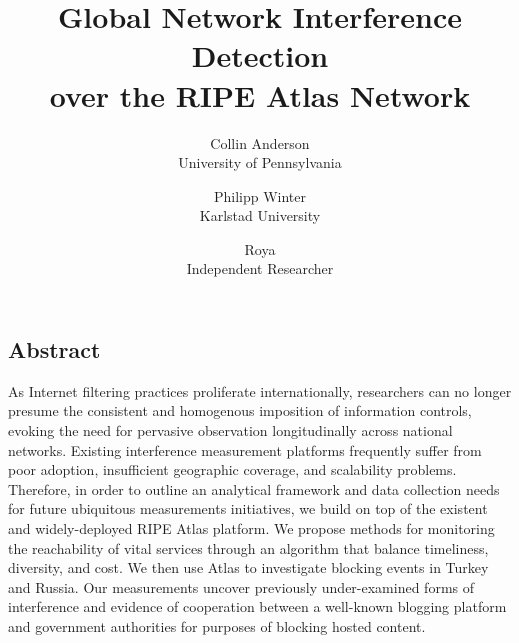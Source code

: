 \documentclass[letterpaper,twocolumn,10pt]{article}
\begin{document}
\date{}

\title{
	\Large \bf Global Network Interference Detection \\
	over the RIPE Atlas Network
}

\author{
	{\rm Collin Anderson} \\
	University of Pennsylvania
	\and
	{\rm Philipp Winter} \\
	Karlstad University
	\and
	{\rm Roya} \\
	Independent Researcher
}

\maketitle

\thispagestyle{empty}

\subsection*{Abstract}

As Internet filtering practices proliferate internationally, researchers can no longer presume the consistent and homogenous imposition of information controls, evoking the need for pervasive observation longitudinally across national networks. Existing interference measurement platforms frequently suffer from poor adoption, insufficient geographic coverage, and scalability problems. Therefore, in order to outline an analytical framework and data collection needs for future ubiquitous measurements initiatives, we build on top of the existent and widely-deployed RIPE Atlas platform. We propose methods for monitoring the reachability of vital services through an algorithm that balance timeliness, diversity, and cost. We then use Atlas to investigate blocking events in Turkey and Russia. Our measurements uncover previously under-examined forms of interference and evidence of cooperation between a well-known blogging platform and government authorities for purposes of blocking hosted content.













\raggedright
\printbibliography

\end{document}
